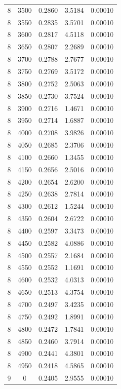\begin{longtable}{ccccc}
    8 & 3500 & 0.2860 & 3.5184 & 0.00010 \\
    8 & 3550 & 0.2835 & 3.5701 & 0.00010 \\
    8 & 3600 & 0.2817 & 4.5118 & 0.00010 \\
    8 & 3650 & 0.2807 & 2.2689 & 0.00010 \\
    8 & 3700 & 0.2788 & 2.7677 & 0.00010 \\
    8 & 3750 & 0.2769 & 3.5172 & 0.00010 \\
    8 & 3800 & 0.2752 & 2.5063 & 0.00010 \\
    8 & 3850 & 0.2730 & 3.7524 & 0.00010 \\
    8 & 3900 & 0.2716 & 1.4671 & 0.00010 \\
    8 & 3950 & 0.2714 & 1.6887 & 0.00010 \\
    8 & 4000 & 0.2708 & 3.9826 & 0.00010 \\
    8 & 4050 & 0.2685 & 2.3706 & 0.00010 \\
    8 & 4100 & 0.2660 & 1.3455 & 0.00010 \\
    8 & 4150 & 0.2656 & 2.5016 & 0.00010 \\
    8 & 4200 & 0.2654 & 2.6200 & 0.00010 \\
    8 & 4250 & 0.2638 & 2.7814 & 0.00010 \\
    8 & 4300 & 0.2612 & 1.5244 & 0.00010 \\
    8 & 4350 & 0.2604 & 2.6722 & 0.00010 \\
    8 & 4400 & 0.2597 & 3.3473 & 0.00010 \\
    8 & 4450 & 0.2582 & 4.0886 & 0.00010 \\
    8 & 4500 & 0.2557 & 2.1684 & 0.00010 \\
    8 & 4550 & 0.2552 & 1.1691 & 0.00010 \\
    8 & 4600 & 0.2532 & 4.0313 & 0.00010 \\
    8 & 4650 & 0.2513 & 4.3754 & 0.00010 \\
    8 & 4700 & 0.2497 & 3.4235 & 0.00010 \\
    8 & 4750 & 0.2492 & 1.8991 & 0.00010 \\
    8 & 4800 & 0.2472 & 1.7841 & 0.00010 \\
    8 & 4850 & 0.2460 & 3.7914 & 0.00010 \\
    8 & 4900 & 0.2441 & 4.3801 & 0.00010 \\
    8 & 4950 & 0.2418 & 4.5865 & 0.00010 \\
    9 & 0 & 0.2405 & 2.9555 & 0.00010 \\

\end{longtable}
